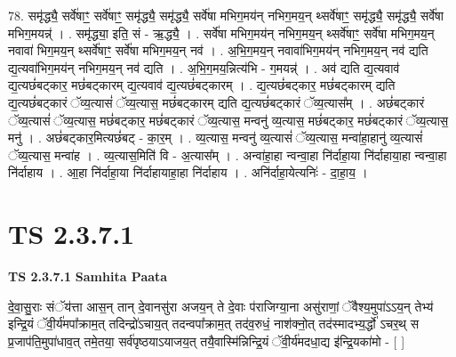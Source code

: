 \documentclass[17pt]{extarticle}
\begin{document}
78. समृ॑द्ध्यै॒ सर्वे॑षाꣳ॒॒ सर्वे॑षाꣳ॒॒ समृ॑द्ध्यै॒ समृ॑द्ध्यै॒ सर्वे॑षा मभिग॒मय॑न् नभिग॒मय॒न् थ्सर्वे॑षाꣳ॒॒ समृ॑द्ध्यै॒ समृ॑द्ध्यै॒ सर्वे॑षा मभिग॒मयन्न्॑ । . समृ॑द्ध्या॒ इति॒ सं - ऋ॒द्ध्यै॒ । . सर्वे॑षा मभिग॒मय॑न् नभिग॒मय॒न् थ्सर्वे॑षाꣳ॒॒ सर्वे॑षा मभिग॒मय॒न् नवावा॑ भिग॒मय॒न् थ्सर्वे॑षाꣳ॒॒ सर्वे॑षा मभिग॒मय॒न् नव॑ । . अ॒भि॒ग॒मय॒न् नवावा॑भिग॒मय॑न् नभिग॒मय॒न् नव॑ द्यति द्य॒त्यवा॑भिग॒मय॑न् नभिग॒मय॒न् नव॑ द्यति । . अ॒भि॒ग॒मय॒न्नित्य॑भि - ग॒मयन्न्॑ । . अव॑ द्यति द्य॒त्यवाव॑ द्य॒त्यछं॑बट्कार॒ मछं॑बट्कारम् द्य॒त्यवाव॑ द्य॒त्यछं॑बट्कारम् । . द्य॒त्यछं॑बट्कार॒ मछं॑बट्कारम् द्यति द्य॒त्यछं॑बट्कारं ॅव्य॒त्यासं॑ ॅव्य॒त्यास॒ मछं॑बट्कारम् द्यति द्य॒त्यछं॑बट्कारं ॅव्य॒त्यास᳚म् । . अछं॑बट्कारं ॅव्य॒त्यासं॑ ॅव्य॒त्यास॒ मछं॑बट्कार॒ मछं॑बट्कारं ॅव्य॒त्यास॒ मन्वनु॑ व्य॒त्यास॒ मछं॑बट्कार॒ मछं॑बट्कारं ॅव्य॒त्यास॒ मनु॑ । . अछं॑बट्कार॒मित्यछं॑बट् - का॒र॒म् । . व्य॒त्यास॒ मन्वनु॑ व्य॒त्यासं॑ ॅव्य॒त्यास॒ मन्वा॑हा॒हानु॑ व्य॒त्यासं॑ ॅव्य॒त्यास॒ मन्वा॑ह । . व्य॒त्यास॒मिति॑ वि - अ॒त्यास᳚म् । . अन्वा॑हा॒हा न्वन्वा॒हा नि॑र्दाहा॒या नि॑र्दाहाया॒हा न्वन्वा॒हा नि॑र्दाहाय । . आ॒हा नि॑र्दाहा॒या नि॑र्दाहायाहा॒हा नि॑र्दाहाय । . अनि॑र्दाहा॒येत्यनिः॑ - दा॒हा॒य॒ । \newline
\pagebreak
{}

\section{ TS 2.3.7.1 }

\textbf{TS 2.3.7.1 } \newline
\textbf{Samhita Paata} \newline

दे॒वा॒सु॒राः संॅय॑त्ता आस॒न् तान् दे॒वानसु॑रा अजय॒न् ते दे॒वाः प॑राजिग्या॒ना असु॑राणां॒ ॅवैश्य॒मुपा॑ऽऽय॒न् तेभ्य॑ इन्द्रि॒यं ॅवी॒र्य॑मपा᳚क्राम॒त् तदिन्द्रो॑ऽचाय॒त् तदन्वपा᳚क्राम॒त् तद॑व॒रुधं॒ नाश॑क्नो॒त् तद॑स्मादभ्य॒र्द्धो॑ ऽचर॒थ् स प्र॒जाप॑ति॒मुपा॑धाव॒त् तमे॒तया॒ सर्व॑पृष्ठयाऽयाजय॒त् तयै॒वास्मि॑न्निन्द्रि॒यं ॅवी॒र्य॑मदधा॒द्य इ॑न्द्रि॒यका॑मो - [  ] \newline
\end{document}
